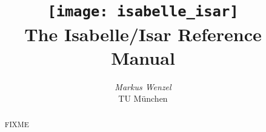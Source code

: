 \documentclass[12pt]{report}
\title{\texttt{[image: isabelle\_isar]} \\[4ex] The Isabelle/Isar Reference Manual}
\author{\emph{Markus Wenzel} \\ TU M\"unchen}
\begin{document}
\underscoreoff

\maketitle 

\begin{abstract}
  FIXME
\end{abstract}

 \tableofcontents \clearfirst

\nocite{Rudnicki:1992:MizarOverview}
\nocite{Harrison:1996:MizarHOL}
\nocite{Rudnicki:1992:MizarOverview}
\nocite{Trybulec:1993:MizarFeatures}
\nocite{Syme:1997:DECLARE}
\nocite{Syme:1998:thesis}
\nocite{Syme:1999:TPHOL}
\nocite{Wenzel:1999:TPHOL}









\begingroup
   \small\raggedright\frenchspacing
  
\endgroup


\end{document}
